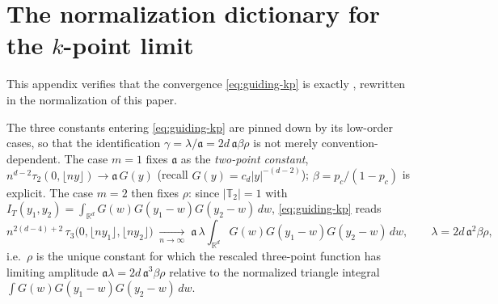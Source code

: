 \documentclass[11pt]{article}
\theoremstyle{definition}
\theoremstyle{remark}
\newcommand{\R}{\mathbb{R}}
\newcommand{\T}{\mathbb{T}}                    %
\newcommand{\fl}[1]{\lfloor #1\rfloor}
\numberwithin{equation}{section}
\theoremstyle{plain}
\theoremstyle{definition}
\theoremstyle{remark}
\theoremstyle{plain}
\begin{document}

\appendix
\section{The normalization dictionary for the $k$-point limit}\label{app:dictionary}

This appendix verifies that the convergence \eqref{eq:guiding-kp} is exactly \cite[Theorem~1]{CCHS26}, rewritten in the normalization of this paper.

The three constants entering \eqref{eq:guiding-kp} are pinned down by its
low-order cases, so that the identification $\gamma=\lambda/\mathfrak a=2d\,\mathfrak a\beta\rho$ is
not merely convention-dependent. The case $m=1$ fixes $\mathfrak a$ as the
\emph{two-point constant}, $n^{d-2}\tau_2(0,\fl{ny})\to\mathfrak a\,G(y)$ (recall
$G(y)=c_d|y|^{-(d-2)}$); $\beta=p_c/(1-p_c)$ is explicit. The case $m=2$ then
fixes $\rho$: since $|\T_2|=1$ with $I_T(y_1,y_2)=\int_{\R^d}G(w)G(y_1-w)G(y_2-w)\,dw$,
\eqref{eq:guiding-kp} reads
\[
n^{2(d-4)+2}\,\tau_3\bigl(0,\fl{ny_1},\fl{ny_2}\bigr)
\;\xrightarrow[n\to\infty]{}\;
\mathfrak a\,\lambda\int_{\R^d}G(w)G(y_1-w)G(y_2-w)\,dw,
\qquad \lambda=2d\,\mathfrak a^2\beta\rho,
\]
i.e.\ $\rho$ is the unique constant for which the rescaled three-point
function has limiting amplitude $\mathfrak a\lambda=2d\,\mathfrak a^3\beta\rho$ relative
to the normalized triangle integral $\int G(w)G(y_1-w)G(y_2-w)\,dw$.
\end{document}
